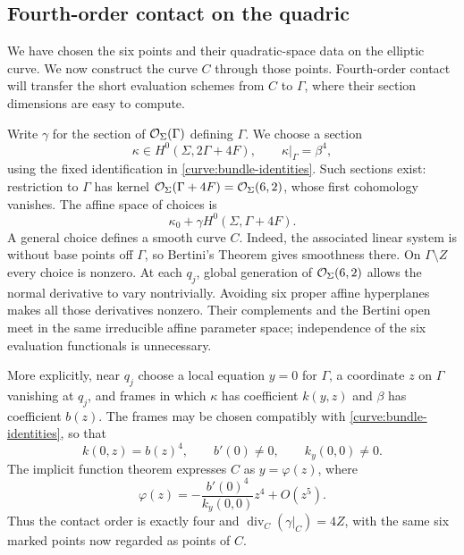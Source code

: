 \subsection{Fourth-order contact on the quadric}

We have chosen the six points and their quadratic-space data on the
elliptic curve. We now construct the curve $C$ through those points.
Fourth-order contact will transfer the short evaluation schemes from
$C$ to $\Gamma$, where their section dimensions are easy to compute.

Write $\gamma$ for the section of $\mathcal O_\Sigma(\Gamma)$ defining
$\Gamma$.  We choose a section
\[
 \kappa\in H^0(\Sigma,2\Gamma+4F),\qquad
 \kappa|_\Gamma=\beta^4,
\]
using the fixed identification in \eqref{curve:bundle-identities}.
Such sections exist: restriction to $\Gamma$ has kernel
$\mathcal O_\Sigma(\Gamma+4F)=\mathcal O_\Sigma(6,2)$, whose first cohomology
vanishes.  The affine space of choices is
\[
 \kappa_0+\gamma H^0(\Sigma,\Gamma+4F).
\]
A general choice defines a smooth curve $C$.  Indeed, the associated
linear system is without base points off $\Gamma$, so Bertini's
Theorem gives smoothness there.  On $\Gamma\setminus Z$ every choice
is nonzero.  At each $q_j$, global generation of
$\mathcal O_\Sigma(6,2)$ allows the normal derivative to vary nontrivially.
Avoiding six proper affine hyperplanes makes all those derivatives
nonzero.  Their complements and the Bertini open meet in the same
irreducible affine parameter space; independence of the six evaluation
functionals is unnecessary.

More explicitly, near $q_j$ choose a local equation $y=0$ for
$\Gamma$, a coordinate $z$ on $\Gamma$ vanishing at $q_j$, and frames
in which $\kappa$ has coefficient $k(y,z)$ and $\beta$ has coefficient
$b(z)$.  The frames may be chosen compatibly with
\eqref{curve:bundle-identities}, so that
\[
 k(0,z)=b(z)^4,\qquad b'(0)\ne0,\qquad k_y(0,0)\ne0.
\]
The implicit function theorem expresses $C$ as $y=\varphi(z)$, where
\begin{equation}\label{curve:contact-expansion}
 \varphi(z)=-\frac{b'(0)^4}{k_y(0,0)}z^4+O(z^5).
\end{equation}
Thus the contact order is exactly four and
$\operatorname{div}_C(\gamma|_C)=4Z$, with the same six marked points
now regarded as points of $C$.

